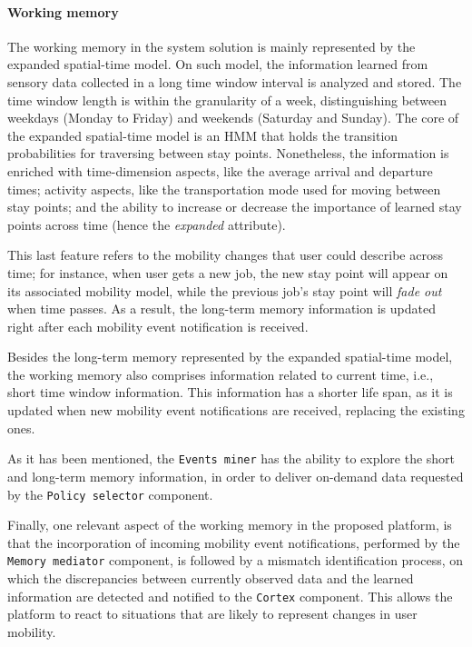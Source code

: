 \documentclass[ENG,PhD]{cinvestav}
\begin{document}
\paragraph{Working memory}
The working memory in the system solution is mainly represented by the expanded spatial-time model.
On such model, the information learned from sensory data collected in a long time window interval is analyzed and stored.
The time window length is within the granularity of a week, distinguishing between weekdays (Monday to Friday) and weekends (Saturday and Sunday).
The core of the expanded spatial-time model is an HMM that holds the transition probabilities for traversing between stay points.
Nonetheless, the information is enriched with time-dimension aspects, like the average arrival and departure times; activity aspects, like the transportation mode used for moving between stay points; and the ability to increase or decrease the importance of learned stay points across time (hence the \emph{expanded} attribute). 

This last feature refers to the mobility changes that user could describe across time; for instance, when user gets a new job, the new stay point will appear on its associated mobility model, while the previous job's stay point will \emph{fade out} when time passes.
As a result, the long-term memory information is updated right after each mobility event notification is received.

Besides the long-term memory represented by the expanded spatial-time model, the working memory also comprises information related to current time, i.e., short time window information.
This information has a shorter life span, as it is updated when new mobility event notifications are received, replacing the existing ones. 

As it has been mentioned, the \texttt{Events miner} has the ability to explore the short and long-term memory information, in order to deliver on-demand data requested by the \texttt{Policy selector} component.

Finally, one relevant aspect of the working memory in the proposed platform, is that the incorporation of incoming mobility event notifications, performed by the \texttt{Memory mediator} component, is followed by a mismatch identification process, on which the discrepancies between currently observed data and the learned information are detected and notified to the \texttt{Cortex} component.
This allows the platform to react to situations that are likely to represent changes in user mobility.
\end{document}
